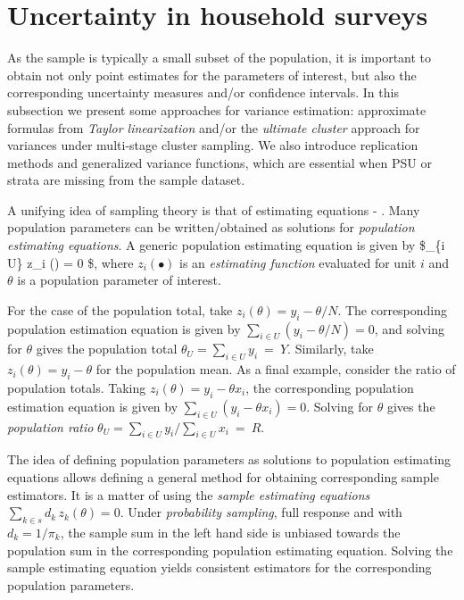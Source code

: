\documentclass[
  12pt,
]{book}
\begin{document}
\hypertarget{uncertainty-in-household-surveys}{%
\section{Uncertainty in household surveys}\label{uncertainty-in-household-surveys}}

As the sample is typically a small subset of the population, it is important to obtain not only point estimates for the parameters of interest, but also the corresponding uncertainty measures and/or confidence intervals. In this subsection we present some approaches for variance estimation: approximate formulas from \emph{Taylor linearization} and/or the \emph{ultimate cluster} approach for variances under multi-stage cluster sampling. We also introduce replication methods and generalized variance functions, which are essential when PSU or strata are missing from the sample dataset.

A unifying idea of sampling theory is that of estimating equations - \citet{Binder1983}. Many population parameters can be written/obtained as solutions for \emph{population estimating equations}. A generic population estimating equation is given by \$\sum\_\{i \in U\} z\_i (\theta) = 0 \$, where \(z_i(\bullet)\) is an \emph{estimating function} evaluated for unit \(i\) and \(\theta\) is a population parameter of interest.

For the case of the population total, take \(z_i(\theta) = y_i - \theta / N\). The corresponding population estimation equation is given by \(\sum _{i \in U} (y_i - \theta / N) = 0\), and solving for \(\theta\) gives the population total \(\theta_U = \sum _{i \in U} y_i \ = \ Y\). Similarly, take \(z_i(\theta) = y_i - \theta\) for the population mean. As a final example, consider the ratio of population totals. Taking \(z_i(\theta) = y_i - \theta x_i\), the corresponding population estimation equation is given by \(\sum _{i \in U} (y_i - \theta x_i) = 0\). Solving for \(\theta\) gives the \emph{population ratio} \(\theta_U = \sum _{i \in U} y_i / \sum _{i \in U} x_i \ = \ R\).

The idea of defining population parameters as solutions to population estimating equations allows defining a general method for obtaining corresponding sample estimators. It is a matter of using the \emph{sample estimating equations} \(\sum _{k \in s} d_k \, z_k (\theta) = 0\). Under \emph{probability sampling}, full response and with \(d_k = 1 / \pi_k\), the sample sum in the left hand side is unbiased towards the population sum in the corresponding population estimating equation. Solving the sample estimating equation yields consistent estimators for the corresponding population parameters.
\end{document}

